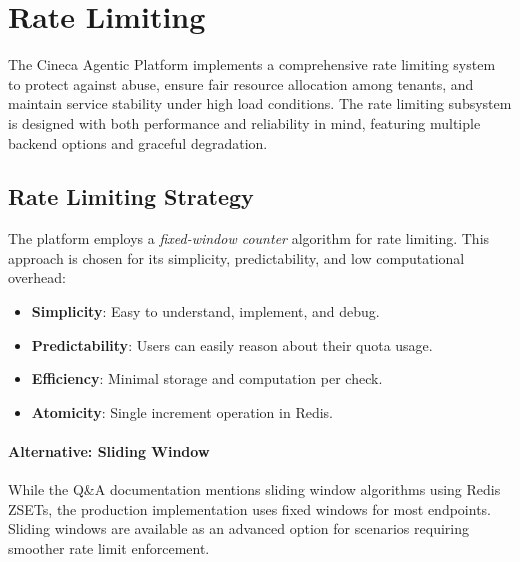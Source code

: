 
\section{Rate Limiting}
\label{sec:rate-limiting}

The Cineca Agentic Platform implements a comprehensive rate limiting system to protect against abuse, ensure fair resource allocation among tenants, and maintain service stability under high load conditions. The rate limiting subsystem is designed with both performance and reliability in mind, featuring multiple backend options and graceful degradation.

\subsection{Rate Limiting Strategy}
\label{subsec:rate-limit-strategy}

The platform employs a \textit{fixed-window counter} algorithm for rate limiting. This approach is chosen for its simplicity, predictability, and low computational overhead:

\begin{itemize}
    \item \textbf{Simplicity}: Easy to understand, implement, and debug.
    \item \textbf{Predictability}: Users can easily reason about their quota usage.
    \item \textbf{Efficiency}: Minimal storage and computation per check.
    \item \textbf{Atomicity}: Single increment operation in Redis.
\end{itemize}

\paragraph{Alternative: Sliding Window}
While the Q\&A documentation mentions sliding window algorithms using Redis ZSETs, the production implementation uses fixed windows for most endpoints. Sliding windows are available as an advanced option for scenarios requiring smoother rate limit enforcement.

